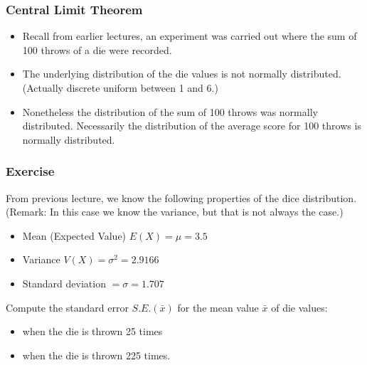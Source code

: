 \documentclass[a4]{beamer}
\begin{document}
\begin{frame}
\frametitle{Central Limit Theorem}

\begin{itemize}

\item Recall from earlier lectures, an experiment was carried out where the sum of 100 throws of a die were recorded.

\item The underlying distribution of the die values is not normally distributed. \\(Actually discrete uniform between 1 and 6.)

\item Nonetheless the distribution of the sum of 100 throws was normally distributed. Necessarily the distribution of the average score for 100 throws is normally distributed.

\end{itemize}
\end{frame}

\begin{frame}
\frametitle{Exercise}
From previous lecture, we know the following properties of the dice distribution. \\(Remark: In this case we know the variance, but that is not always the case.)
\begin{itemize}
\item Mean (Expected Value) $E(X) = \mu = 3.5$
\item Variance $V(X) = \sigma^2 = 2.9166$
\item Standard deviation $= \sigma = 1.707$
\end{itemize}

Compute the standard error $S.E.(\bar{x})$ for the mean value $\bar{x}$ of die values:
\begin{itemize}
\item when the die is thrown 25 times
\item when the die is thrown 225 times.
\end{itemize}
\end{frame}
\end{document}
